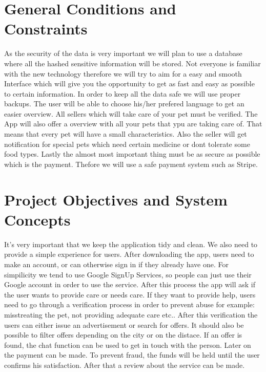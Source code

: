 \documentclass[12pt]{article}
\theoremstyle{definition}
\newenvironment{explanation}{%
}{}
\begin{document}
\section{General Conditions and Constraints}
As the security of the data is very important we will plan to use a database where all the hashed sensitive information will be stored.
\newline
Not everyone is familiar with the new technology therefore we will try to aim for a easy and smooth Interface which will give you the opportunity
to get as fast and easy as possible to certain information.
\newline
In order to keep all the data safe we will use proper backups. The user will be able to choose his/her prefered language to get an easier overview.
\newline
All sellers which will take care of your pet must be verified.
\newline
The App will also offer a overview with all your pets that ypu are taking care of. That means that every pet will have a small characteristics. 
Also the seller will get notification for special pets which need certain medicine or dont tolerate some food types. 
\newline
Lastly the almost most important thing must be as secure as possible which is the payment. Thefore we will use a safe payment system such as Stripe. 
\pagebreak

\section{Project Objectives and System Concepts}
\begin{explanation}
It's very important that we keep the application tidy and clean. We also need to provide a simple experience for users.
\newline
After downloading the app, users need to make an account, or can otherwise sign in if they already have one.
\newline
For simpilicity we tend to use Google SignUp Services, so people can just use their Google account in order to use the service.
\newline
After this process the app will ask if the user wants to provide care or needs care.
\newline
If they want to provide help, users need to go through a verification process in order to prevent abuse for example: misstreating the pet, not providing adequate care etc..
\newline
After this verification the users can either issue an advertisement or search for offers. It should also be possible to filter offers depending on the city or on the distace.
\newline
If an offer is found, the chat function can be used to get in touch with the person. Later on the payment can be made.
\newline
To prevent fraud, the funds will be held until the user confirms his satisfaction.
\newline
After that a review about the service can be made.
\end{explanation}
\end{document}
